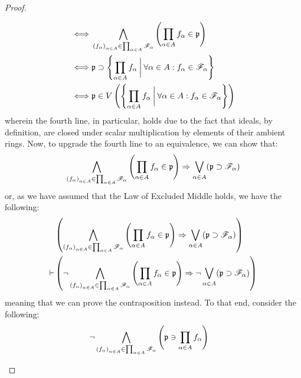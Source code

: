 \begin{proof}
\begin{enumerate}
$$\begin{aligned}
                                        \iff & \bigwedge_{\left(f_{\alpha}\right)_{\alpha \in A} \in \prod_{\alpha \in A} \scrF_{\alpha}} \left(\prod_{\alpha \in A} f_{\alpha} \in \p\right)
                                        \\
                                        \iff & \p \supset \left\{\prod_{\alpha \in A} f_{\alpha} \: \bigg| \: \forall \alpha \in A: f_{\alpha} \in \scrF_{\alpha} \right\}
                                        \\
                                        \iff & \p \in V\left(\left\{\prod_{\alpha \in A} f_{\alpha} \: \bigg| \: \forall \alpha \in A: f_{\alpha} \in \scrF_{\alpha} \right\}\right)
                                    \end{aligned}
                                $$
                            wherein the fourth line, in particular, holds due to the fact that ideals, by definition, are closed under scalar multiplication by elements of their ambient rings. Now, to upgrade the fourth line to an equivalence, we can show that:
                                $$\bigwedge_{\left(f_{\alpha}\right)_{\alpha \in A} \in \prod_{\alpha \in A} \scrF_{\alpha}} \left(\prod_{\alpha \in A} f_{\alpha} \in \p\right) \implies \bigvee_{\alpha \in A} (\p \supset \scrF_{\alpha})$$
                            or, as we have assumed that the Law of Excluded Middle holds, we have the following:
                                $$
                                    \begin{aligned}
                                        & \left(\bigwedge_{\left(f_{\alpha}\right)_{\alpha \in A} \in \prod_{\alpha \in A} \scrF_{\alpha}} \left(\prod_{\alpha \in A} f_{\alpha} \in \p\right) \implies \bigvee_{\alpha \in A} (\p \supset \scrF_{\alpha})\right)
                                        \\
                                        \vdash & \left(\neg \bigwedge_{\left(f_{\alpha}\right)_{\alpha \in A} \in \prod_{\alpha \in A} \scrF_{\alpha}} \left(\prod_{\alpha \in A} f_{\alpha} \in \p\right) \implies  \neg \bigvee_{\alpha \in A} (\p \supset \scrF_{\alpha})\right)
                                    \end{aligned}
                                $$
                            meaning that we can prove the contraposition instead. To that end, consider the following:
                                $$
                                    \begin{aligned}
                                        & \neg \bigwedge_{\left(f_{\alpha}\right)_{\alpha \in A} \in \prod_{\alpha \in A} \scrF_{\alpha}} \left(\p \ni \prod_{\alpha \in A} f_{\alpha}\right)

\end{aligned}$$
\end{enumerate}
\end{proof}
